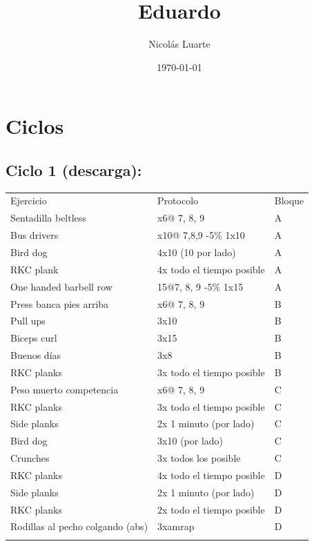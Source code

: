 \documentclass[11pt]{article}
\author{Nicolás Luarte}
\date{\today}
\title{Eduardo}
\begin{document}
\maketitle
\tableofcontents

\section{Ciclos}
\label{sec:org739da5c}
\subsection{Ciclo 1 (descarga):}
\label{sec:orga26776c}
\begin{center}
\begin{tabular}{lll}
Ejercicio & Protocolo & Bloque\\
Sentadilla beltless & x6@ 7, 8, 9 & A\\
Bus drivers & x10@ 7,8,9 -5\% 1x10 & A\\
Bird dog & 4x10 (10 por lado) & A\\
RKC plank & 4x todo el tiempo posible & A\\
One handed barbell row & 15@7, 8, 9 -5\% 1x15 & A\\
\hline
Press banca pies arriba & x6@ 7, 8, 9 & B\\
Pull ups & 3x10 & B\\
Biceps curl & 3x15 & B\\
Buenos días & 3x8 & B\\
RKC planks & 3x todo el tiempo posible & B\\
\hline
Peso muerto competencia & x6@ 7, 8, 9 & C\\
RKC planks & 3x todo el tiempo posible & C\\
Side planks & 2x 1 minuto (por lado) & C\\
Bird dog & 3x10 (por lado) & C\\
Crunches & 3x todos los posible & C\\
\hline
RKC planks & 4x todo el tiempo posible & D\\
Side planks & 2x 1 minuto (por lado) & D\\
RKC planks & 2x todo el tiempo posible & D\\
Rodillas al pecho colgando (abs) & 3xamrap & D\\
 &  & \\
\end{tabular}
\end{center}
\end{document}
